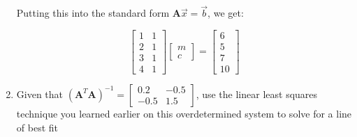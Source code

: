 \begin{enumerate}
{    Putting this into the standard form $\mathbf{A}\vec{x}=\vec{b}$, we get:
    
    $$\begin{bmatrix}1&1\\2&1\\3&1\\4&1\end{bmatrix}\begin{bmatrix}m\\c\end{bmatrix} = \begin{bmatrix}6\\5\\7\\10\end{bmatrix}$$
    
    }
    
\item{
    Given that $(\mathbf{A}^T\mathbf{A})^{-1} = \begin{bmatrix}0.2&-0.5\\-0.5&1.5\end{bmatrix}$, use the linear least squares technique you learned earlier on this overdetermined system to solve for a line of best fit
}



\end{enumerate}

